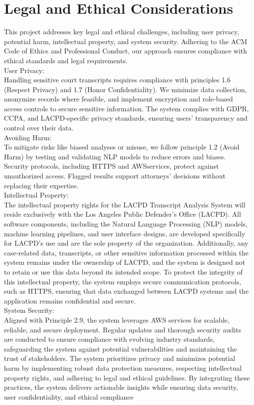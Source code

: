 \documentclass[12pt]{article}
\begin{document}
\section{Legal and Ethical Considerations}
 This project addresses key legal and ethical challenges, including user privacy, potential harm,
 intellectual property, and system security. Adhering to the ACM Code of Ethics and Professional
 Conduct, our approach ensures compliance with ethical standards and legal requirements.\\
 User Privacy:\\
 Handling sensitive court transcripts requires compliance with principles 1.6 (Respect
 Privacy) and 1.7 (Honor Confidentiality). We minimize data collection, anonymize records
 where feasible, and implement encryption and role-based access controls to secure sensitive
 information. The system complies with GDPR, CCPA, and LACPD-specific privacy standards,
 ensuring users’ transparency and control over their data.\\
 Avoiding Harm:\\
 To mitigate risks like biased analyses or misuse, we follow principle 1.2 (Avoid Harm) by
 testing and validating NLP models to reduce errors and biases. Security protocols, including
 HTTPS and AWSservices, protect against unauthorized access. Flagged results support
 attorneys’ decisions without replacing their expertise.\\
 Intellectual Property:\\
 The intellectual property rights for the LACPD Transcript Analysis System will reside
 exclusively with the Los Angeles Public Defender’s Office (LACPD). All software components,
 including the Natural Language Processing (NLP) models, machine learning pipelines, and user
 interface designs, are developed specifically for LACPD's use and are the sole property of the
 organization. Additionally, any case-related data, transcripts, or other sensitive information
 processed within the system remains under the ownership of LACPD, and the system is designed
 not to retain or use this data beyond its intended scope. To protect the integrity of this intellectual
 property, the system employs secure communication protocols, such as HTTPS, ensuring that
 data exchanged between LACPD systems and the application remains confidential and secure.\\
 System Security:\\
 Aligned with Principle 2.9, the system leverages AWS services for scalable, reliable, and
 secure deployment. Regular updates and thorough security audits are conducted to ensure
 compliance with evolving industry standards, safeguarding the system against potential
 vulnerabilities and maintaining the trust of stakeholders.
 The system prioritizes privacy and minimizes potential harm by implementing robust data
 protection measures, respecting intellectual property rights, and adhering to legal and ethical
 guidelines. By integrating these practices, the system delivers actionable insights while ensuring
 data security, user confidentiality, and ethical compliance
\appendix
\end{document}
